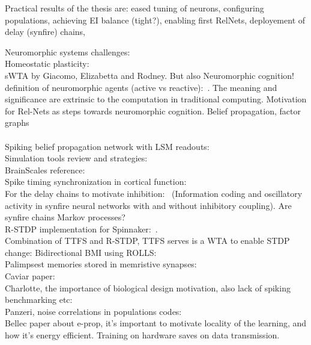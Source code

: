 

Practical results of the thesis are:
eased tuning of neurons, configuring populations, achieving EI balance (tight?), enabling first RelNets, deployement of delay (synfire) chains, 


Neuromorphic systems challenges:~\cite{Indiveri_etal15, Indiveri_Liu15}\\
Homeostatic plasticity:~\cite{Turrigiano_Nelson04}\\
sWTA by Giacomo, Elizabetta and Rodney. But also Neuromorphic cognition! definition of neuromorphic agents (active vs reactive):~\cite{Indiveri_etal09}. The meaning and significance are extrinsic to the computation in traditional computing. Motivation for Rel-Nets as steps towards neuromorphic cognition. Belief propagation, factor graphs\\
\\
Spiking belief propagation network with LSM readouts:~\cite{Steimer_etal09}\\
Simulation tools review and strategies:~\cite{Brette_etal07}\\
BrainScales reference:~\cite{Pehle_etal22}\\
Spike timing synchronization in cortical function: \cite{Riehle_etal97}\\
For the delay chains to motivate inhibition:~\cite{Moradi04} (Information coding and oscillatory activity in synfire neural networks with and without inhibitory coupling). Are synfire chains Markov processes?\\
R-STDP implementation for Spinnaker:~\cite{Shahsavari_etal21}.\\
Combination of TTFS and R-STDP, TTFS serves is a WTA to enable STDP change: \cite{Mozafari_etal18}
Bidirectional BMI using ROLLS:~\cite{Boi_etal16}\\
Palimpsest memories stored in memristive synapses: \cite{Giotis_etal22}\\
Caviar paper:~\cite{Serrano-Gotarredona_etal09}\\
Charlotte, the importance of biological design motivation, also lack of spiking benchmarking etc:\cite{Frenkel_etal23}\\
Panzeri, noise correlations in populations codes:~\cite{Panzeri_etal22}\\
Bellec paper about e-prop, it's important to motivate locality of the learning, and how it's energy efficient. Training on hardware saves on data transmission.~\cite{Bellec_etal20}\\
